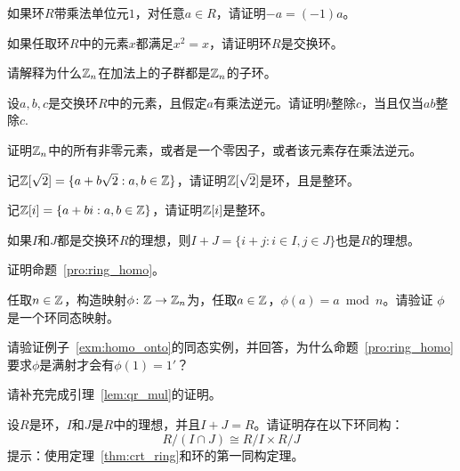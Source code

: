  \begin{problemset}
   \item 如果环$R$带乘法单位元$1$，对任意$a\in R$，请证明$-a = (-1) a$。%
 
  \item 如果任取环$R$中的元素$x$都满足$x^2 = x$，请证明环$R$是交换环。
  
  \item 请解释为什么${\mathbb Z}_n$在加法上的子群都是${\mathbb Z}_n$的子环。
  
  \item 设$a, b, c$是交换环$R$中的元素，且假定$a$有乘法逆元。请证明$b$整除$c$，当且仅当$ab$整除$c$.
  
  \item 证明${\mathbb Z}_n$中的所有非零元素，或者是一个零因子，或者该元素存在乘法逆元。
  
  \item 记${\mathbb Z}[\sqrt{2}] = \{a + b\sqrt{2}: a, b \in {\mathbb Z} \}$，请证明${\mathbb Z}[\sqrt{2}] $是环，且是整环。
  
  \item 记${\mathbb Z}[i] = \{a + bi: a, b \in {\mathbb Z} \}$，请证明${\mathbb Z}[i]$是整环。%
 
  \item 如果$I$和$J$都是交换环$R$的理想，则$I+J = \{ i + j : i \in I, j \in J\}$也是$R$的理想。 
  
  \item 证明命题~\ref{pro:ring_homo}。
  
  \item 任取$n \in {\mathbb Z}$，构造映射$\phi\colon {\mathbb Z} \to {\mathbb Z}_n$为，任取$a \in {\mathbb Z}$，$\phi(a) = a \bmod n$。请验证
  $\phi$是一个环同态映射。
  
  \item 请验证例子~\ref{exm:homo_onto}的同态实例，并回答，为什么命题~\ref{pro:ring_homo}要求$\phi$是满射才会有$\phi(1) = 1'$？
  
  \item 请补充完成引理~\ref{lem:qr_mul}的证明。
  
  \item 设$R$是环，$I$和$J$是$R$中的理想，并且$I + J = R$。请证明存在以下环同构：
  \[R/(I \cap J) \cong R/I \times R/J\]
  提示：使用定理~\ref{thm:crt_ring}和环的第一同构定理。
  

\end{problemset}
